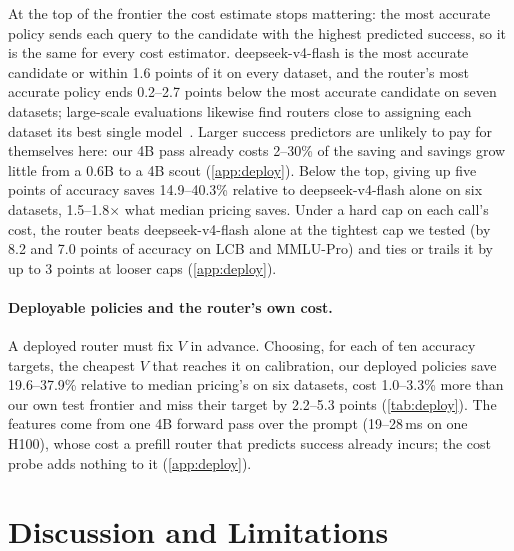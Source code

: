 \documentclass[10pt]{article}
\begin{document}
At the top of the frontier the cost estimate stops mattering: the most accurate policy sends each query to the candidate with the highest predicted success, so it is the same for every cost estimator. deepseek-v4-flash is the most accurate candidate or within 1.6 points of it on every dataset, and the router's most accurate policy ends 0.2--2.7 points below the most accurate candidate on seven datasets; large-scale evaluations likewise find routers close to assigning each dataset its best single model~\citep{llmrouterbench}. Larger success predictors are unlikely to pay for themselves here: our 4B pass already costs 2--30\% of the saving and savings grow little from a 0.6B to a 4B scout (\cref{app:deploy}). Below the top, giving up five points of accuracy saves 14.9--40.3\% relative to deepseek-v4-flash alone on six datasets, 1.5--1.8$\times$ what median pricing saves. Under a hard cap on each call's cost, the router beats deepseek-v4-flash alone at the tightest cap we tested (by 8.2 and 7.0 points of accuracy on LCB and MMLU-Pro) and ties or trails it by up to 3 points at looser caps (\cref{app:deploy}).

\paragraph{Deployable policies and the router's own cost.}
A deployed router must fix $V$ in advance. Choosing, for each of ten accuracy targets, the cheapest $V$ that reaches it on calibration, our deployed policies save 19.6--37.9\% relative to median pricing's on six datasets, cost 1.0--3.3\% more than our own test frontier and miss their target by 2.2--5.3 points (\cref{tab:deploy}). The features come from one 4B forward pass over the prompt (19--28\,ms on one H100), whose cost a prefill router that predicts success already incurs; the cost probe adds nothing to it (\cref{app:deploy}).


\section{Discussion and Limitations}
\end{document}
